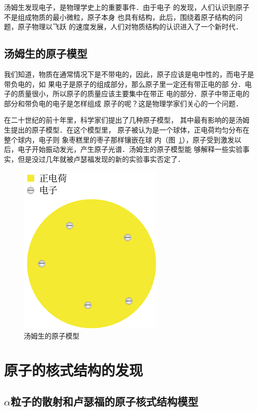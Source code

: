 汤姆生发现电子，是物理学史上的重要事件．由于电子
的发现，人们认识到原子不是组成物质的最小微粒，原子本身
也具有结构，此后，围绕着原子结构的问题，原子物理以飞跃
的速度发展，人们对物质结构的认识进入了一个新时代．

\subsection{汤姆生的原子模型}

我们知道，物质在通常情况下是不带电的，因此，原子应该是电中性的，而电子是带负电的，如
果电子是原子的组成部分，那么原子里一定还有带正电的部
分．电子的质量很小，所以原子的质量应该主要集中在带正
电的部分．原子中带正电的部分和带负电的电子是怎样组成
原子的呢？这是物理学家们关心的一个问题．

在二十世纪的前十年里，科学家们提出了几种原子模型，
其中最有影响的是汤姆生提出的原子模型．在这个模型里，
原子被认为是一个球体，正电荷均匀分布在整个球内，电子则
象枣糕里的枣子那样镶嵌在球
内（图~\ref{fig_C_8-1}），原子受到激发以后，电子开始振动发光，产生原子光谱．汤姆生的原子模型能
够解释一些实验事实，但是没过几年就被卢瑟福发现的新的实验事实否定了．
\begin{figure}[htbp]
    \centering
    \includegraphics{fig/C/8-1.pdf}
    \caption{汤姆生的原子模型}\label{fig_C_8-1}
\end{figure}

\section{原子的核式结构的发现}
\subsection{$\alpha$粒子的散射和卢瑟福的原子核式结构模型} 

